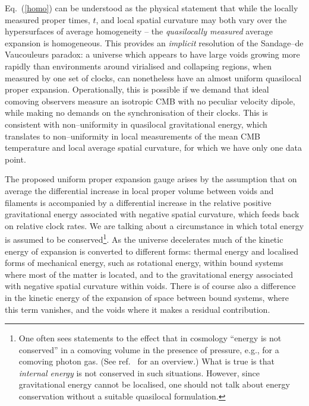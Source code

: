 \documentclass[12pt]{iopart}
\begin{document}
Eq.\ (\ref{homo}) can be understood as the physical statement that while
the locally measured proper times, $t$, and local spatial curvature may both
vary over the hypersurfaces of average homogeneity -- the {\em quasilocally
measured} average expansion is homogeneous. This provides an {\em implicit}
resolution of the Sandage--de Vaucouleurs paradox: a universe which appears
to have large voids growing more rapidly than environments around virialised
and collapsing regions, when measured by one set of clocks, can nonetheless
have an almost uniform quasilocal proper expansion.
Operationally, this is possible if we demand that
ideal comoving observers measure an isotropic CMB with no peculiar velocity
dipole, while making no demands on the synchronisation of their clocks.
This is consistent with non--uniformity in quasilocal gravitational
energy, which translates to non--uniformity in local measurements of the
mean CMB temperature and local average spatial curvature, for which we have
only one data point.

The proposed uniform proper expansion gauge arises by the assumption that on
average the differential increase in local proper volume between voids and
filaments is accompanied by a differential increase in the relative
positive gravitational energy associated with negative spatial curvature,
which feeds back on relative clock rates. We are talking about a circumstance
in which total energy is assumed to be conserved\footnote{One often sees
statements to the effect that in cosmology ``energy is not conserved'' in a
comoving volume in the presence of pressure, e.g., for a comoving photon
gas. (See ref.\ \cite{bary} for an overview.) What is true is that
{\em internal energy} is not conserved in such situations. However, since
gravitational energy cannot be localised, one should not talk about
energy conservation without a suitable quasilocal formulation.}. As the
universe decelerates much of the kinetic energy of expansion is converted to
different forms: thermal energy and localised forms of mechanical energy,
such as rotational energy, within bound systems where most of the matter is
located, and to the gravitational energy associated with negative spatial
curvature within voids. There is of course also a difference in the kinetic
energy of the expansion of space between bound systems, where this term
vanishes, and the voids where it makes a residual contribution.
\end{document}
